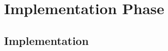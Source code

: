 \part{Implementation Phase}
\label{sec:impl_part}
\chapter{Implementation}
\thispagestyle{fancy}






